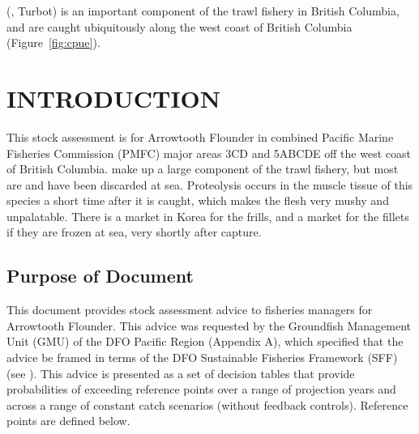 

\fishname (\emph{\sciencename}, Turbot) is an important component of the trawl fishery in British Columbia, and are caught ubiquitously along the west coast of British Columbia (Figure~\ref{fig:cpue}).

\newpage	%



\clearpage

\setcounter{page}{1}

\section{INTRODUCTION}

This stock assessment is for Arrowtooth Flounder in combined Pacific Marine Fisheries Commission (PMFC) major areas 3CD and 5ABCDE off the west coast of British Columbia. \fishname make up a large component of the trawl fishery, but most are and have been discarded at sea. Proteolysis occurs in the muscle tissue of this species a short time after it is caught, which makes the flesh very mushy and unpalatable. There is a market in Korea for the frills, and a market for the fillets if they are frozen at sea, very shortly after capture.

\subsection{Purpose of Document}

This document provides stock assessment advice to fisheries managers for Arrowtooth Flounder. This advice was requested by the Groundfish Management Unit (GMU) of the DFO Pacific Region (Appendix A), which specified that the advice be framed in terms of the DFO Sustainable Fisheries Framework (SFF) (see \citet{dfo09}). This advice is presented as a set of decision tables that provide probabilities of exceeding reference points over a range of projection years and across a range of constant catch scenarios (without feedback controls). Reference points are defined below.

